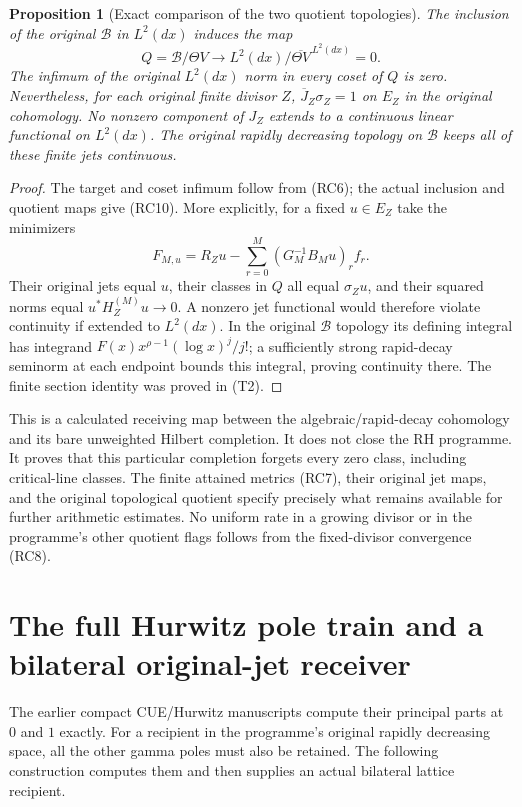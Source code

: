 \documentclass[11pt]{article}
\newtheorem{proposition}[theorem]{Proposition}
\newcommand{\B}{\mathscr B}\newcommand{\M}{\mathcal M}
\begin{document}
\begin{proposition}[Exact comparison of the two quotient topologies]
The inclusion of the original $\B$ in $L^2(dx)$ induces the map
\[
 Q=\B/\Theta V\longrightarrow
 L^2(dx)/\overline{\Theta V}^{\,L^2(dx)}=0.
 \tag{RC10}
\]
The infimum of the original $L^2(dx)$ norm in every coset of $Q$
is zero. Nevertheless, for each original finite divisor $Z$,
$\overline J_Z\sigma_Z=1$ on $E_Z$ in the original cohomology.
No nonzero component of $J_Z$ extends to a continuous linear
functional on $L^2(dx)$. The original rapidly decreasing topology
on $\B$ keeps all of these finite jets continuous.
\end{proposition}
\begin{proof}
The target and coset infimum follow from (RC6); the actual
inclusion and quotient maps give (RC10). More explicitly, for a
fixed $u\in E_Z$ take the minimizers
\[
 F_{M,u}=R_Zu-\sum_{r=0}^M (G_M^{-1}B_Mu)_r f_r.
\]
Their original jets equal $u$, their classes in $Q$ all equal
$\sigma_Zu$, and their squared norms equal
$u^*H_Z^{(M)}u\to0$. A nonzero jet functional would therefore
violate continuity if extended to $L^2(dx)$. In the original
$\B$ topology its defining integral has integrand
$F(x)x^{\rho-1}(\log x)^j/j!$; a sufficiently strong rapid-decay
seminorm at each endpoint bounds this integral, proving continuity
there. The finite section identity was proved in (T2).
\end{proof}

This is a calculated receiving map between the algebraic/rapid-decay
cohomology and its bare unweighted Hilbert completion. It does not
close the RH programme. It proves that this particular completion
forgets every zero class, including critical-line classes. The
finite attained metrics (RC7), their original jet maps, and the
original topological quotient specify precisely what remains
available for further arithmetic estimates. No uniform rate in a
growing divisor or in the programme's other quotient flags follows
from the fixed-divisor convergence (RC8).

\section{The full Hurwitz pole train and a bilateral original-jet receiver}
The earlier compact CUE/Hurwitz manuscripts compute their principal
parts at $0$ and $1$ exactly. For a recipient in the programme's
original rapidly decreasing space, all the other gamma poles must
also be retained. The following construction computes them and
then supplies an actual bilateral lattice recipient.
\end{document}
